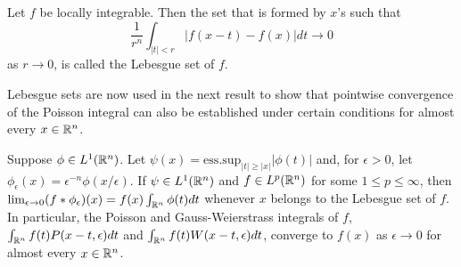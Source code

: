 \begin{definition}
    Let $f$ be locally integrable. Then the set that is formed by $x$'s such that
    \begin{equation*}
        \frac{1}{r^n}\int_{|t|<r}|f(x-t)-f(x)|dt\rightarrow0
    \end{equation*}
    as $r\rightarrow0$, is called the Lebesgue set of $f$.
\end{definition}

Lebesgue sets are now used in the next result to show that pointwise convergence of the Poisson integral can also be established under certain conditions for almost every $x\in\mathbb R^n$. 

\begin{lemma}\label{lemma:125}
    Suppose $\phi\in L^1(\mathbb R^n)$. Let $\psi(x)=\mathrm{ess. sup}_{|t|\geq|x|}|\phi(t)|$ and, for $\epsilon>0$, let $\phi_\epsilon(x)=\epsilon^{-n}\phi(x/\epsilon)$. If $\psi\in L^1(\mathbb R^n)$ and $f\in L^p(\mathbb R^n)$ for some $1\leq p\leq\infty$, then $\lim_{\epsilon\rightarrow0}(f*\phi_\epsilon)(x)=f(x)\int_{\mathbb R^n}\phi(t)dt$ whenever $x$ belongs to the Lebesgue set of $f$. In particular, the Poisson and Gauss-Weierstrass integrals of $f$, $\int_{\mathbb R^n}f(t)P(x-t,\epsilon)dt$ and $\int_{\mathbb R^n}f(t)W(x-t,\epsilon)dt$, converge to $f(x)$ as $\epsilon\rightarrow0$ for almost every $x\in\mathbb R^n$.
\end{lemma}
